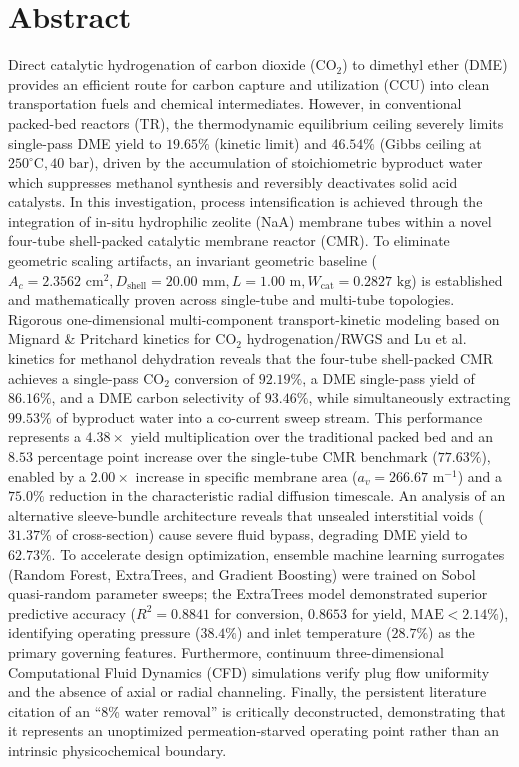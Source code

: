 \documentclass[12pt,a4paper]{article}
\begin{document}
\section*{Abstract}
Direct catalytic hydrogenation of carbon dioxide ($\text{CO}_2$) to dimethyl ether (DME) provides an efficient route for carbon capture and utilization (CCU) into clean transportation fuels and chemical intermediates. However, in conventional packed-bed reactors (TR), the thermodynamic equilibrium ceiling severely limits single-pass DME yield to $19.65\%$ (kinetic limit) and $46.54\%$ (Gibbs ceiling at $250^\circ\text{C}, 40\text{ bar}$), driven by the accumulation of stoichiometric byproduct water which suppresses methanol synthesis and reversibly deactivates solid acid catalysts. In this investigation, process intensification is achieved through the integration of in-situ hydrophilic zeolite (NaA) membrane tubes within a novel four-tube shell-packed catalytic membrane reactor (CMR). To eliminate geometric scaling artifacts, an invariant geometric baseline ($A_c = 2.3562\text{ cm}^2, D_{\text{shell}} = 20.00\text{ mm}, L = 1.00\text{ m}, W_{\text{cat}} = 0.2827\text{ kg}$) is established and mathematically proven across single-tube and multi-tube topologies. Rigorous one-dimensional multi-component transport-kinetic modeling based on Mignard \& Pritchard kinetics for $\text{CO}_2$ hydrogenation/RWGS and Lu et al. kinetics for methanol dehydration reveals that the four-tube shell-packed CMR achieves a single-pass $\text{CO}_2$ conversion of $92.19\%$, a DME single-pass yield of $86.16\%$, and a DME carbon selectivity of $93.46\%$, while simultaneously extracting $99.53\%$ of byproduct water into a co-current sweep stream. This performance represents a $4.38\times$ yield multiplication over the traditional packed bed and an $8.53\text{ percentage point}$ increase over the single-tube CMR benchmark ($77.63\%$), enabled by a $2.00\times$ increase in specific membrane area ($a_v = 266.67\text{ m}^{-1}$) and a $75.0\%$ reduction in the characteristic radial diffusion timescale. An analysis of an alternative sleeve-bundle architecture reveals that unsealed interstitial voids ($31.37\%$ of cross-section) cause severe fluid bypass, degrading DME yield to $62.73\%$. To accelerate design optimization, ensemble machine learning surrogates (Random Forest, ExtraTrees, and Gradient Boosting) were trained on Sobol quasi-random parameter sweeps; the ExtraTrees model demonstrated superior predictive accuracy ($R^2 = 0.8841$ for conversion, $0.8653$ for yield, $\text{MAE} < 2.14\%$), identifying operating pressure ($38.4\%$) and inlet temperature ($28.7\%$) as the primary governing features. Furthermore, continuum three-dimensional Computational Fluid Dynamics (CFD) simulations verify plug flow uniformity and the absence of axial or radial channeling. Finally, the persistent literature citation of an ``8\% water removal'' is critically deconstructed, demonstrating that it represents an unoptimized permeation-starved operating point rather than an intrinsic physicochemical boundary.
\end{document}
